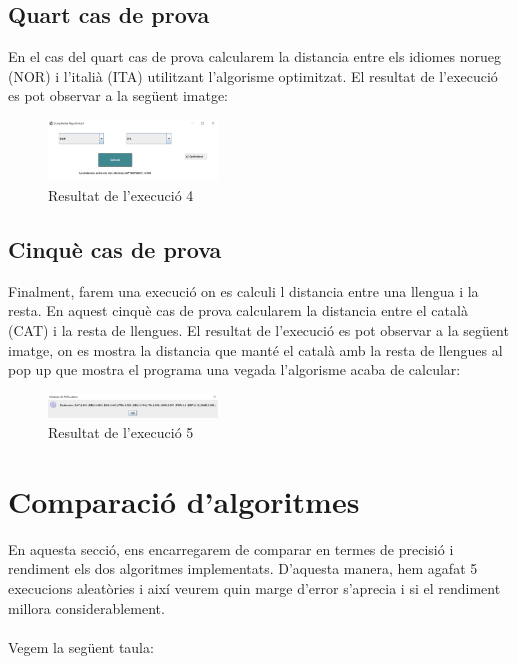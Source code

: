 \documentclass[conference]{IEEEtran}
\begin{document}
\subsection{Quart cas de prova}
En el cas del quart cas de prova calcularem la distancia entre els idiomes norueg (NOR) i l'italià (ITA) utilitzant l'algorisme optimitzat. El resultat de l'execució es pot observar a la següent imatge:
\begin{figure}[ht]
    \centering
    \includegraphics[width=0.4\textwidth]{images/execucio4.png}
    \caption{Resultat de l'execució 4}
\end{figure}
\subsection{Cinquè cas de prova}
Finalment, farem una execució on es calculi l distancia entre una llengua i la resta. En aquest cinquè cas de prova calcularem la distancia entre el català (CAT) i la resta de llengues. El resultat de l'execució es pot observar a la següent imatge, on es mostra la distancia que manté el català amb la resta de llengues al pop up que mostra el programa una vegada l'algorisme acaba de calcular:
\begin{figure}[ht]
    \centering
    \includegraphics[width=0.4\textwidth]{images/execucio5.png}
    \caption{Resultat de l'execució 5}
\end{figure}

\section{Comparació d'algoritmes}
    En aquesta secció, ens encarregarem de comparar en termes de precisió i rendiment els dos algoritmes implementats. D'aquesta manera, hem agafat 5 execucions aleatòries i així veurem quin marge d'error s'aprecia i si el rendiment millora considerablement.\\\\ Vegem la següent taula:\\\\
\end{document}
